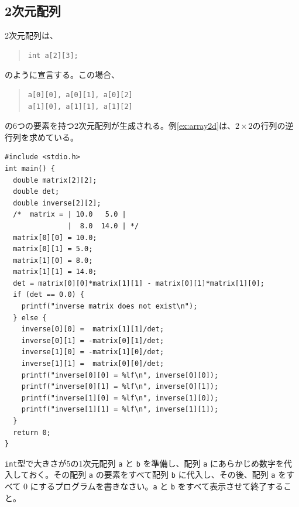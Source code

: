 \subsection{2次元配列}
2次元配列は、
%
\begin{quote}
\begin{verbatim}
int a[2][3];
\end{verbatim}
\end{quote}
%
のように宣言する。この場合、
%
\begin{quote}
\begin{verbatim}
a[0][0], a[0][1], a[0][2]
a[1][0], a[1][1], a[1][2]
\end{verbatim}
\end{quote}
%
の6つの要素を持つ2次元配列が生成される。例\ref{ex:array2d}は、$2 \times 2$の行列の逆行列を求めている。
%
\begin{reidai}\label{ex:array2d}
\begin{verbatim}
#include <stdio.h>
int main() {
  double matrix[2][2];
  double det;
  double inverse[2][2];
  /*  matrix = | 10.0   5.0 |
               |  8.0  14.0 | */
  matrix[0][0] = 10.0;
  matrix[0][1] = 5.0;
  matrix[1][0] = 8.0;
  matrix[1][1] = 14.0;
  det = matrix[0][0]*matrix[1][1] - matrix[0][1]*matrix[1][0];
  if (det == 0.0) {
    printf("inverse matrix does not exist\n");
  } else {
    inverse[0][0] =  matrix[1][1]/det;
    inverse[0][1] = -matrix[0][1]/det;
    inverse[1][0] = -matrix[1][0]/det;
    inverse[1][1] =  matrix[0][0]/det;
    printf("inverse[0][0] = %lf\n", inverse[0][0]);
    printf("inverse[0][1] = %lf\n", inverse[0][1]);
    printf("inverse[1][0] = %lf\n", inverse[1][0]);
    printf("inverse[1][1] = %lf\n", inverse[1][1]);
  }
  return 0;
}
\end{verbatim}
\end{reidai}
%

\begin{renshuu}\label{prob:3-1}
\verb|int|型で大きさが5の1次元配列 \verb|a| と \verb|b| を準備し、配列 \verb|a| にあらかじめ数字を代入しておく。その配列 \verb|a| の要素をすべて配列 \verb|b| に代入し、その後、配列 \verb|a| をすべて 0 にするプログラムを書きなさい。\verb|a| と \verb|b| をすべて表示させて終了すること。
\end{renshuu}

